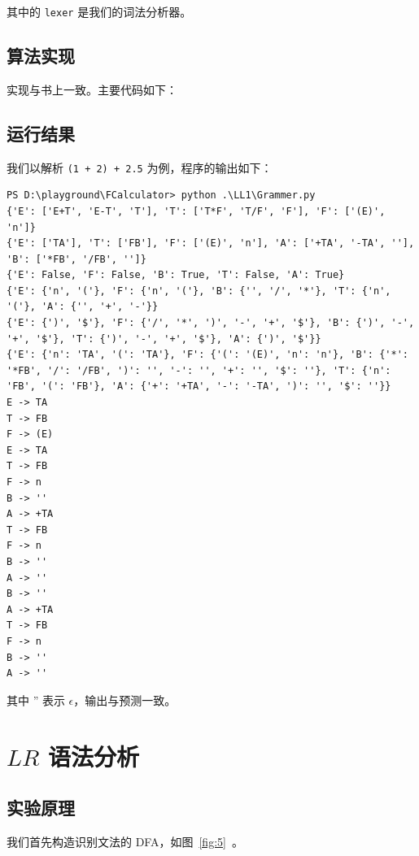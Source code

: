 \documentclass[blue,normal,cn]{elegantnote}
\begin{document}
其中的 \texttt{lexer} 是我们的词法分析器。

\subsection{算法实现}

实现与书上一致。主要代码如下：


\subsection{运行结果}

我们以解析 \texttt{(1 + 2) + 2.5} 为例，程序的输出如下：

\begin{lstlisting}
PS D:\playground\FCalculator> python .\LL1\Grammer.py
{'E': ['E+T', 'E-T', 'T'], 'T': ['T*F', 'T/F', 'F'], 'F': ['(E)', 'n']}
{'E': ['TA'], 'T': ['FB'], 'F': ['(E)', 'n'], 'A': ['+TA', '-TA', ''], 'B': ['*FB', '/FB', '']}
{'E': False, 'F': False, 'B': True, 'T': False, 'A': True}
{'E': {'n', '('}, 'F': {'n', '('}, 'B': {'', '/', '*'}, 'T': {'n', '('}, 'A': {'', '+', '-'}}
{'E': {')', '$'}, 'F': {'/', '*', ')', '-', '+', '$'}, 'B': {')', '-', '+', '$'}, 'T': {')', '-', '+', '$'}, 'A': {')', '$'}}
{'E': {'n': 'TA', '(': 'TA'}, 'F': {'(': '(E)', 'n': 'n'}, 'B': {'*': '*FB', '/': '/FB', ')': '', '-': '', '+': '', '$': ''}, 'T': {'n': 'FB', '(': 'FB'}, 'A': {'+': '+TA', '-': '-TA', ')': '', '$': ''}}
E -> TA
T -> FB
F -> (E)
E -> TA
T -> FB
F -> n
B -> ''
A -> +TA
T -> FB
F -> n
B -> ''
A -> ''
B -> ''
A -> +TA
T -> FB
F -> n
B -> ''
A -> ''
\end{lstlisting}

其中 '' 表示 $\epsilon$，输出与预测一致。

\section{$LR$ 语法分析}

\subsection{实验原理}
我们首先构造识别文法的 DFA，如图~\ref{fig:5}~。
\end{document}
